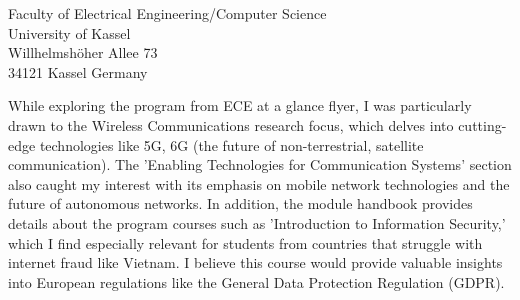 \documentclass[a4paper,12pt]{letter}
\begin{document}
\begin{letter}{
    Faculty of Electrical Engineering/Computer Science
    \\ University of Kassel
    \\ Willhelmshöher Allee 73
    \\ 34121 Kassel Germany
}

\vspace{1cm}
While exploring the program from ECE at a glance flyer, I was particularly drawn to the Wireless Communications research focus, which delves into cutting-edge technologies like 5G, 6G (the future of non-terrestrial, satellite communication). The 'Enabling Technologies for Communication Systems' section also caught my interest with its emphasis on mobile network technologies and the future of autonomous networks. In addition, the module handbook provides details about the program courses such as 'Introduction to Information Security,' which I find especially relevant for students from countries that struggle with internet fraud like Vietnam. I believe this course would provide valuable insights into European regulations like the General Data Protection Regulation (GDPR).


\end{letter}
\end{document}
